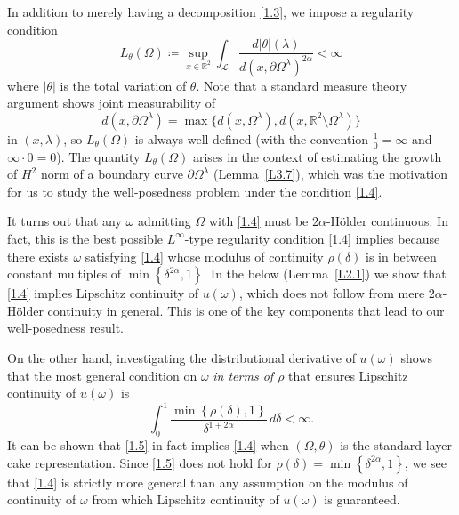 \documentclass[reqno,centertags,12pt]{amsart}
\theoremstyle{definition}
\numberwithin{equation}{section}
\newcommand{\abs}[1]{\left\lvert#1\right\rvert}
\newcommand{\set}[1]{\left\{ #1 \right\}}
\newcommand{\bbR}{{\mathbb{R}}}
\newcommand{\tht}{\theta}
\begin{document}
In addition to merely having a decomposition \eqref{1.3},
we impose a regularity condition
\begin{equation}\label{1.4}
    L_{\tht}(\Omega)\coloneqq \sup_{x\in\bbR^{2}}\int_{\mathcal{L}}
    \frac{d|\theta|(\lambda)}{d(x,\partial\Omega^{\lambda})^{2\alpha}} < \infty
\end{equation}
where $\abs{\theta}$ is the total variation of $\theta$. 
Note that a standard measure theory argument shows joint measurability of
\[
    d(x,\partial\Omega^{\lambda}) = \max\{
        d(x,\Omega^{\lambda}),
        d(x,\bbR^{2}\setminus\Omega^{\lambda})
    \}
\]
in $(x,\lambda)$, so $L_{\tht}(\Omega)$ is always well-defined
(with the convention $\frac{1}{0} = \infty$ and $\infty\cdot 0 = 0$).
The quantity $L_{\tht}(\Omega)$ arises in the context of estimating the growth of
$H^{2}$ norm of a boundary curve $\partial\Omega^{\lambda}$ (Lemma~\ref{L3.7}),
which was the motivation for us to study the well-posedness problem
under the condition \eqref{1.4}.

It turns out that any $\omega$ admitting $\Omega$ with \eqref{1.4} must be
$2\alpha$-H\"{o}lder continuous. In fact, this is the best possible
$L^{\infty}$-type regularity condition \eqref{1.4} implies because
there exists $\omega$ satisfying \eqref{1.4} whose modulus of continuity $\rho(\delta)$
is in between constant multiples of $\min\left\{\delta^{2\alpha},1\right\}$.
In the below (Lemma~\ref{L2.1}) we show that \eqref{1.4} implies
Lipschitz continuity of $u(\omega)$, which does not follow from mere
$2\alpha$-H\"{o}lder continuity in general. This is one of the key components that lead to
our well-posedness result.

On the other hand, investigating the distributional derivative of
$u(\omega)$ shows that the most general condition on $\omega$
\emph{in terms of $\rho$} that ensures Lipschitz continuity of $u(\omega)$ is
\begin{equation}\label{1.5}
    \int_{0}^{1}\frac{\min\set{\rho(\delta),1}}{\delta^{1+2\alpha}}\,d\delta < \infty.
\end{equation}
It can be shown that \eqref{1.5} in fact implies \eqref{1.4} when $(\Omega,\theta)$
is the standard layer cake representation.
Since \eqref{1.5} does not hold for
$\rho(\delta) = \min\set{\delta^{2\alpha},1}$, we see that \eqref{1.4}
is strictly more general than any assumption on the modulus of continuity of $\omega$
from which Lipschitz continuity of $u(\omega)$ is guaranteed.
\end{document}
